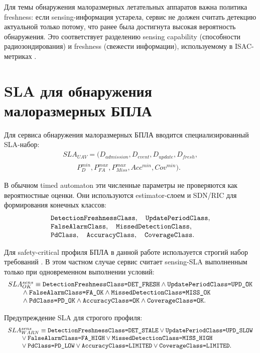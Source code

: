 \documentclass[10pt,a4paper]{article}
\newcommand{\code}[1]{\ifmmode\text{\ttfamily\detokenize{#1}}\else\texttt{\detokenize{#1}}\fi}
\begin{document}
Для темы обнаружения малоразмерных летательных аппаратов важна политика freshness: если sensing-информация устарела, сервис не должен считать детекцию актуальной только потому, что ранее была достигнута высокая вероятность обнаружения. Это соответствует разделению sensing capability (способности радиозондирования) и freshness (свежести информации), используемому в ISAC-метриках \cite{liu_senscap,liu_coop}.

\section{SLA для обнаружения малоразмерных БПЛА}

Для сервиса обнаружения малоразмерных БПЛА вводится специализированный SLA-набор:
\[
\begin{array}{l}
SLA_{UAV}=(D_{admission},D_{event},D_{update},D_{fresh},\\
\qquad P_D^{min},P_{FA}^{max},P_{Miss}^{max},Acc^{min},Cov^{min}).
\end{array}
\]

В обычном timed automaton эти численные параметры не проверяются как вероятностные оценки. Они используются estimator-слоем и SDN/RIC для формирования конечных классов:
\[
\begin{array}{l}
\code{DetectionFreshnessClass},\quad \code{UpdatePeriodClass},\\
\code{FalseAlarmClass},\quad \code{MissedDetectionClass},\\
\code{PdClass},\quad \code{AccuracyClass},\quad \code{CoverageClass}.
\end{array}
\]

Для safety-critical профиля БПЛА в данной работе используется строгий набор требований \code{REQ_STRICT}. В этом частном случае сервис считает sensing-SLA выполненным только при одновременном выполнении условий:
\[
\begin{array}{l}
SLA^{sens}_{OK}\equiv
\code{DetectionFreshnessClass=DET_FRESH}\land \code{UpdatePeriodClass=UPD_OK}\\
\qquad {}\land \code{FalseAlarmClass=FA_OK}\land
\code{MissedDetectionClass=MISS_OK}\\
\qquad {}\land \code{PdClass=PD_OK}\land \code{AccuracyClass=OK}\land
\code{CoverageClass=OK}.
\end{array}
\]

Предупреждение SLA для строгого профиля:
\[
\begin{array}{l}
SLA^{sens}_{WARN}\equiv
\code{DetectionFreshnessClass=DET_STALE}\vee \code{UpdatePeriodClass=UPD_SLOW}\\
\qquad {}\vee \code{FalseAlarmClass=FA_HIGH}\vee
\code{MissedDetectionClass=MISS_HIGH}\\
\qquad {}\vee \code{PdClass=PD_LOW}\vee \code{AccuracyClass=LIMITED}
\vee \code{CoverageClass=LIMITED}.
\end{array}
\]
\end{document}
